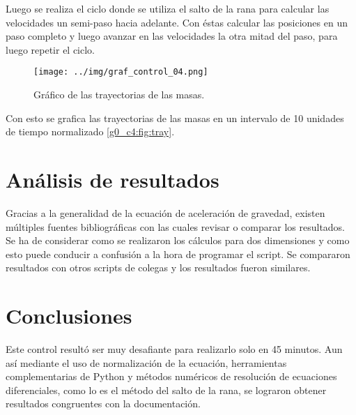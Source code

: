 \documentclass[../portafolio.tex]{subfiles}
\begin{document}
Luego se realiza el ciclo donde se utiliza el salto de la rana para calcular las velocidades un semi-paso hacia adelante. Con éstas calcular las posiciones en un paso completo y luego avanzar en las velocidades la otra mitad del paso, para luego repetir el ciclo.

\begin{figure}
\centering
\texttt{[image: ../img/graf\_control\_04.png]} 
\caption{Gráfico de las trayectorias de las masas.}
\label{g0_c4:fig:tray}
\end{figure}

Con esto se grafica las trayectorias de las masas en un intervalo de 10 unidades de tiempo normalizado \eqref{g0_c4:fig:tray}.

\section{Análisis de resultados}

Gracias a la generalidad de la ecuación de aceleración de gravedad, existen múltiples fuentes bibliográficas con las cuales revisar o comparar los resultados. Se ha de considerar como se realizaron los cálculos para dos dimensiones y como esto puede conducir a confusión a la hora de programar el script. Se compararon resultados con otros scripts de colegas y los resultados fueron similares.

\section*{Conclusiones}

Este control resultó ser muy desafiante para realizarlo solo en 45 minutos. Aun así mediante el uso de normalización de la ecuación, herramientas complementarias de Python y métodos numéricos de resolución de ecuaciones diferenciales, como lo es el método del salto de la rana, se lograron obtener resultados congruentes con la documentación.
\end{document}
